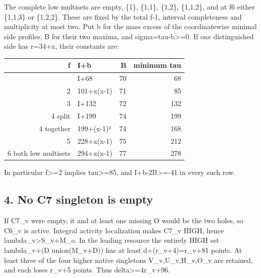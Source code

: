\documentclass[10pt,a4paper]{article}
\theoremstyle{definition}
\begin{document}
The complete low multisets are empty,\allowbreak{} \{1\},\allowbreak{} \{1,\allowbreak{}1\},\allowbreak{} \{1,\allowbreak{}2\},\allowbreak{}
\{1,\allowbreak{}1,\allowbreak{}2\},\allowbreak{} and at f6 either \{1,\allowbreak{}1,\allowbreak{}3\} or \{1,\allowbreak{}2,\allowbreak{}2\}. These are fixed by
the total f-1,\allowbreak{} interval completeness and multiplicity at most two. Put b
for the mass excess of the coordinatewise minimal side profiles,\allowbreak{} B for
their two maxima,\allowbreak{} and sigma=\allowbreak{}tau-b\textgreater=\allowbreak{}0. If one distinguished
side has r=\allowbreak{}34+\allowbreak{}x,\allowbreak{} their constants are:

\begin{longtable}[]{@{}rlrr@{}}
\toprule\noalign{}
f & I+\allowbreak{}b & B & minimum tau \\
\midrule\noalign{}
\endhead
\bottomrule\noalign{}
\endlastfoot
1 & I+\allowbreak{}68 & 70 & 68 \\
2 & 101+\allowbreak{}x(x-1) & 71 & 85 \\
3 & I+\allowbreak{}132 & 72 & 132 \\
4 split & I+\allowbreak{}199 & 74 & 199 \\
4 together & 199+\allowbreak{}(x-1)² & 74 & 168 \\
5 & 228+\allowbreak{}x(x-1) & 75 & 212 \\
6 both low multisets & 294+\allowbreak{}x(x-1) & 77 & 278 \\
\end{longtable}

In particular f\textgreater=\allowbreak{}2 implies tau\textgreater=\allowbreak{}85,\allowbreak{} and
I+\allowbreak{}b-2B\textgreater=\allowbreak{}-41 in every such row.

\hypertarget{no-c7-singleton-is-empty}{%
\subsection{4. No C7 singleton is
empty}\label{no-c7-singleton-is-empty}}

If C7\_\allowbreak{}v were empty,\allowbreak{} it and at least one missing O would be the two
holes,\allowbreak{} so C6\_\allowbreak{}v is active. Integral activity localization makes C7\_\allowbreak{}v
HIGH,\allowbreak{} hence lambda\_\allowbreak{}v\textgreater S\_\allowbreak{}v+\allowbreak{}M\_\allowbreak{}o. In the leading resource the
entirely HIGH set lambda\_\allowbreak{}v+\allowbreak{}(D union(M\_\allowbreak{}v+\allowbreak{}D)) has at least
d+\allowbreak{}(r\_\allowbreak{}v+\allowbreak{}4)=\allowbreak{}r\_\allowbreak{}v+\allowbreak{}81 points. At least three of the four higher native
singletons V\_\allowbreak{}v,\allowbreak{}U\_\allowbreak{}v,\allowbreak{}H\_\allowbreak{}v,\allowbreak{}O\_\allowbreak{}v are retained,\allowbreak{} and each loses r\_\allowbreak{}v+\allowbreak{}5
points. Thus delta\textgreater=\allowbreak{}4r\_\allowbreak{}v+\allowbreak{}96.
\end{document}
